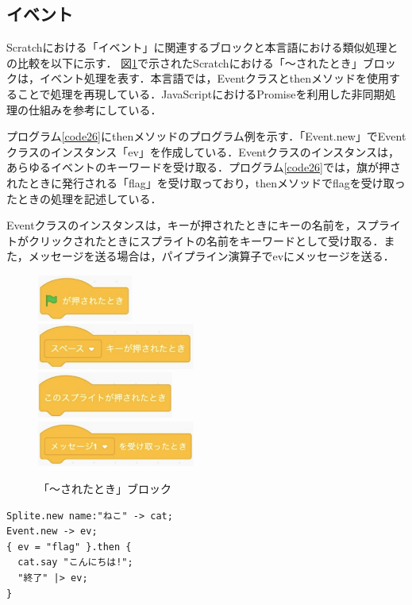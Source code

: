 \documentclass[10pt,a4j]{ltjsarticle}
\begin{document}
\subsection{イベント}
Scratchにおける「イベント」に関連するブロックと本言語における類似処理との比較を以下に示す．
図\ref{fig:then}で示されたScratchにおける「〜されたとき」ブロックは，イベント処理を表す．本言語では，Eventクラスとthenメソッドを使用することで処理を再現している．JavaScriptにおけるPromiseを利用した非同期処理の仕組みを参考にしている．

プログラム\ref{code26}にthenメソッドのプログラム例を示す．「Event.new」でEventクラスのインスタンス「ev」を作成している．Eventクラスのインスタンスは，あらゆるイベントのキーワードを受け取る．プログラム\ref{code26}では，旗が押されたときに発行される「flag」を受け取っており，thenメソッドでflagを受け取ったときの処理を記述している．

Eventクラスのインスタンスは，キーが押されたときにキーの名前を，スプライトがクリックされたときにスプライトの名前をキーワードとして受け取る．また，メッセージを送る場合は，パイプライン演算子でevにメッセージを送る．

\begin{figure}[H]
  \centering
  \includegraphics[height=15mm]{images/flag.pdf} \\
  \includegraphics[height=15mm]{images/keypress.pdf} \\
  \includegraphics[height=15mm]{images/click.pdf} \\
  \includegraphics[height=15mm]{images/message.pdf}
  \caption{「〜されたとき」ブロック}
  \label{fig:then}
\end{figure}

\begin{lstlisting}[caption=thenメソッドのプログラム例, label=code26]
Splite.new name:"ねこ" -> cat;
Event.new -> ev;
{ ev = "flag" }.then {
  cat.say "こんにちは!";
  "終了" |> ev;
}
\end{lstlisting}
\end{document}
